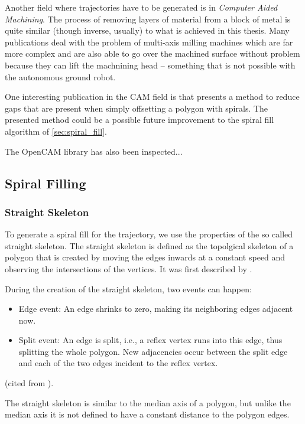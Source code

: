 \documentclass[10pt,twoside,a4paper]{report}
\begin{document}
Another field where trajectories have to be generated is in \textit{Computer Aided Machining}. The process of removing layers of material from a block of metal is quite similar (though inverse, usually) to what is achieved in this thesis. Many publications deal with the problem of multi-axis milling machines which are far more complex and are also able to go over the machined surface without problem because they can lift the machnining head -- something that is not possible with the autonomous ground robot. 

One interesting publication in the CAM field is \cite{kao1998optimal} that presents a method to reduce gaps that are present when simply offsetting a polygon with spirals. The presented method could be a possible future improvement to the spiral fill algorithm of \autoref{sec:spiral_fill}.

The OpenCAM library has also been inspected...

\subsection{Spiral Filling}

\subsubsection{Straight Skeleton}

To generate a spiral fill for the trajectory, we use the properties of the so called straight skeleton. The straight skeleton is defined as the topolgical skeleton of a polygon that is created by moving the edges inwards at a constant speed and observing the intersections of the vertices. It was first described by \citep{Aichholzer:jucs_1_12:a_novel_type_of}. 

During the creation of the straight skeleton, two events can happen: 

\begin{itemize}
\item Edge event: An edge shrinks to zero, making its neighboring edges adjacent now.
\item Split event: An edge is split, i.e., a reflex vertex runs into this edge, thus splitting the whole polygon. New adjacencies occur between the split edge and each of the two edges incident to the reflex vertex.
\end{itemize}
(cited from \citep{Aichholzer:jucs_1_12:a_novel_type_of}).

The straight skeleton is similar to the median axis of a polygon, but unlike the median axis it is not defined to have a constant distance to the polygon edges.
\end{document}

